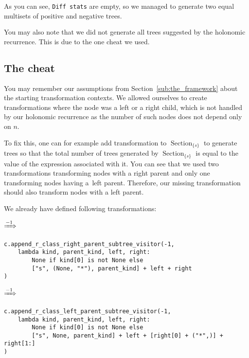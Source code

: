 \documentclass[final]{article}
\theoremstyle{definition}
\theoremstyle{definition}
\theoremstyle{remark}
\DeclareMathOperator{\tSection}{\text{Section}}
\newcommand{\includeinlinescaledsvg}[3]{\begin{minipage}{#1\textwidth}\begin{center}\end{center}\end{minipage}}
\begin{document}
As you can see, \verb|Diff stats| are empty, so we managed to generate two equal multisets of positive and negative trees.

You may also note that we did not generate all trees suggested by the holonomic recurrence. This is due to the one cheat we used.

\subsection{The cheat}%
\label{sub:the_cheat}

You may remember our assumptions from Section~\ref{sub:the_framework} about the starting transformation contexts. We allowed ourselves to create transformations where the node was a left or a right child, which is not handled by our holonomic recurrence as the number of such nodes does not depend only on \(n\).

To fix this, one can for example add transformation to \(\tSection_{\{s\}}\) to generate trees so that the total number of trees generated by \(\tSection_{\{s\}}\) is equal to the value of the expression associated with it. You can see that we used two transformations transforming nodes with a right parent and only one transforming nodes having a~left parent. Therefore, our missing transformation should also transform nodes with a left parent.

We already have defined following transformations:

\begin{center}
    \includeinlinescaledsvg{.4}{.7}{lambda__transformations__003a}%
    \(\xRightarrow{-1}\)%
    \includeinlinescaledsvg{.4}{.7}{lambda__transformations__003b}%
\end{center}

\begin{lstlisting}
c.append_r_class_right_parent_subtree_visitor(-1,
    lambda kind, parent_kind, left, right:
        None if kind[0] is not None else
        ["s", (None, "*"), parent_kind] + left + right
)
\end{lstlisting}

\begin{center}
    \includeinlinescaledsvg{.4}{.7}{lambda__transformations__012a}%
    \(\xRightarrow{-1}\)%
    \includeinlinescaledsvg{.4}{.7}{lambda__transformations__012b}%
\end{center}

\begin{lstlisting}
c.append_r_class_left_parent_subtree_visitor(-1,
    lambda kind, parent_kind, left, right:
        None if kind[0] is not None else
        ["s", None, parent_kind] + left + [right[0] + ("*",)] + right[1:]
)
\end{lstlisting}
\end{document}
